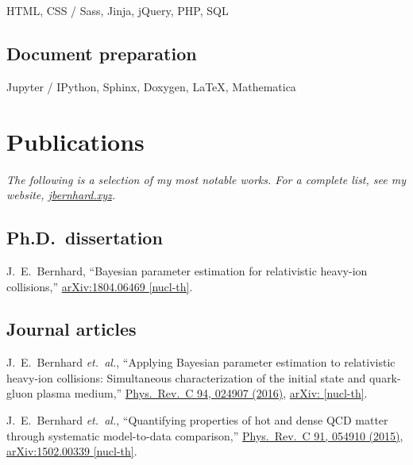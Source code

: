 \documentclass[letterpaper,10pt]{article}
\begin{document}
\begin{multicols}{2}
HTML, CSS / Sass, Jinja, jQuery, PHP, SQL

\subsection{Document preparation}

Jupyter / IPython, Sphinx, Doxygen, \LaTeX, Mathematica



\section{Publications}

\emph{%
  The following is a selection of my most notable works.
  For a complete list, see my website, \href{https://jbernhard.xyz}{jbernhard.xyz}.
}

\subsection{Ph.D.\ dissertation}

J.~E.~Bernhard,
``Bayesian parameter estimation for relativistic heavy-ion collisions,''
\href{https://arxiv.org/abs/1804.06469}{arXiv:1804.06469 [nucl-th]}.

\subsection{Journal articles}

J.~E.~Bernhard \textit{et.\ al.},
``Applying Bayesian parameter estimation to relativistic heavy-ion collisions: Simultaneous characterization of the initial state and quark-gluon plasma medium,''
\href{https://journals.aps.org/prc/abstract/10.1103/PhysRevC.94.024907}{Phys.\ Rev.\ C 94, 024907 (2016)},
\href{https://arxiv.org/abs/1605.03954}{arXiv: [nucl-th]}.

J.~E.~Bernhard \textit{et.\ al.},
``Quantifying properties of hot and dense QCD matter through systematic model-to-data comparison,''
\href{https://journals.aps.org/prc/abstract/10.1103/PhysRevC.91.054910}{Phys.\ Rev.\ C 91, 054910 (2015)},
\href{https://arxiv.org/abs/1502.00339}{arXiv:1502.00339 [nucl-th]}.



\end{multicols}
\end{document}
